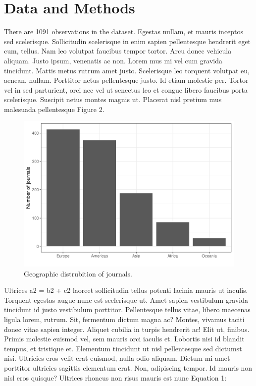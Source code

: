 \documentclass[
  12,
]{article}
\begin{document}
\hypertarget{data-and-methods}{%
\section{Data and Methods}\label{data-and-methods}}

There are 1091 observations in the dataset. Egestas nullam, et mauris
inceptos sed scelerisque. Sollicitudin scelerisque in enim sapien
pellentesque hendrerit eget cum, tellus. Nam leo volutpat faucibus
tempor tortor. Arcu donec vehicula aliquam. Justo ipsum, venenatis ac
non. Lorem mus mi vel cum gravida tincidunt. Mattis metus rutrum amet
justo. Scelerisque leo torquent volutpat eu, aenean, nullam. Porttitor
netus pellentesque justo. Id etiam molestie per. Tortor vel in sed
parturient, orci nec vel ut senectus leo et congue libero faucibus porta
scelerisque. Suscipit netus montes magnis ut. Placerat nisl pretium mus
malesuada pellentesque Figure 2.

\begin{figure}

{\centering \includegraphics[width=0.75\linewidth]{journals_files/figure-latex/barplot-1} 

}

\caption{Geographic distrubition of journals. \label{b_plot}}\label{fig:barplot}
\end{figure}

Ultrices a2 = b2 + c2 laoreet sollicitudin tellus potenti lacinia mauris
ut iaculis. Torquent egestas augue nunc est scelerisque ut. Amet sapien
vestibulum gravida tincidunt id justo vestibulum porttitor. Pellentesque
tellus vitae, libero maecenas ligula lorem, rutrum. Sit, fermentum
dictum magna ac? Montes, vivamus taciti donec vitae sapien integer.
Aliquet cubilia in turpis hendrerit ac! Elit ut, finibus. Primis
molestie euismod vel, sem mauris orci iaculis et. Lobortis nisi id
blandit tempus, et tristique et. Elementum tincidunt ut nisl
pellentesque sed dictumst nisi. Ultricies eros velit erat euismod, nulla
odio aliquam. Dictum mi amet porttitor ultricies sagittis elementum
erat. Non, adipiscing tempor. Id mauris non nisl eros quisque? Ultrices
rhoncus non risus mauris est nunc Equation 1:
\end{document}

